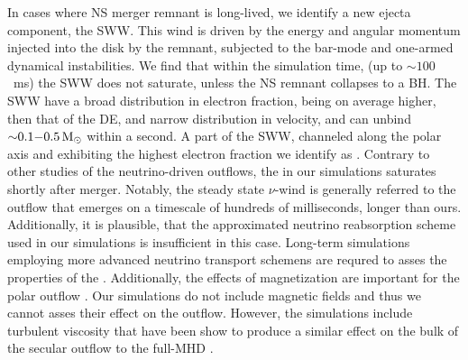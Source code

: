 In cases where \ac{NS} merger remnant is long-lived, we identify a new ejecta component, 
the \ac{SWW}. This wind is driven by the energy and angular momentum injected into the 
disk by the remnant, subjected to the bar-mode and one-armed dynamical instabilities.
We find that within the simulation time, (up to ${\sim}100$~ms) the \ac{SWW} does not 
saturate, unless the \ac{NS} remnant collapses to a \ac{BH}.
The \ac{SWW} have a broad distribution in electron fraction, being on average higher,
then that of the \ac{DE}, and narrow distribution in velocity, and can unbind
${\sim}0.1{-}0.5\, {\text{M}_{\odot}}$ within a second.
A part of the \ac{SWW}, channeled along the polar axis and exhibiting the highest
electron fraction we identify as \nwind{}. Contrary to other studies of the 
neutrino-driven outflows, \citep[\eg][]{Dessart:2008zd,Perego:2014fma,Fujibayashi:2020dvr}
the \nwind{} in our simulations saturates shortly after merger.
%
Notably, the steady state $\nu$-wind is generally referred to the outflow 
that emerges on a timescale of hundreds of milliseconds, longer than ours. Additionally, it is 
plausible, that the approximated neutrino reabsorption scheme used in our 
simulations is insufficient in this case. 
Long-term simulations employing more advanced 
neutrino transport schemens are requred to asses the properties of the \nwind.
%
Additionally, the effects of magnetization are important for the polar outflow 
\citep{Siegel:2017nub,Metzger:2018uni,Fernandez:2018kax,Miller:2019dpt,Mosta:2020hlh}.
Our simulations do not include magnetic fields and thus we cannot asses their 
effect on the outflow. However, the simulations include turbulent viscosity 
that have been show to produce a similar effect on the bulk of the secular 
outflow to the full-\ac{MHD} \citep{Fernandez:2018kax}.

